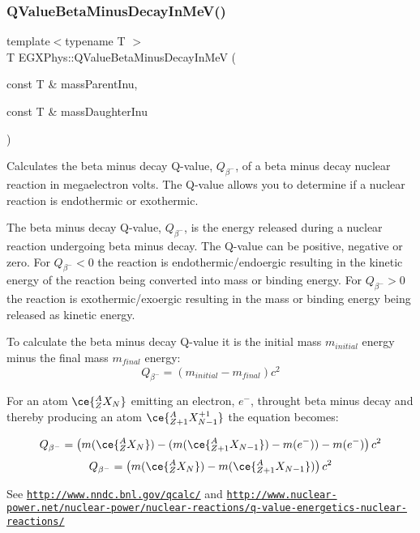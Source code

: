 \subsubsection{\texorpdfstring{Q\+Value\+Beta\+Minus\+Decay\+In\+Me\+V()}{QValueBetaMinusDecayInMeV()}}
{\footnotesize\ttfamily template$<$typename T $>$ \\
T E\+G\+X\+Phys\+::\+Q\+Value\+Beta\+Minus\+Decay\+In\+MeV (\begin{DoxyParamCaption}\item[{const T \&}]{mass\+Parent\+Inu,  }\item[{const T \&}]{mass\+Daughter\+Inu }\end{DoxyParamCaption})}



Calculates the beta minus decay Q-\/value, $Q_{\beta^-}$, of a beta minus decay nuclear reaction in megaelectron volts. The Q-\/value allows you to determine if a nuclear reaction is endothermic or exothermic. 

The beta minus decay Q-\/value, $Q_{\beta^-}$, is the energy released during a nuclear reaction undergoing beta minus decay. The Q-\/value can be positive, negative or zero. For $Q_{\beta^-} < 0$ the reaction is endothermic/endoergic resulting in the kinetic energy of the reaction being converted into mass or binding energy. For $Q_{\beta^-} > 0$ the reaction is exothermic/exoergic resulting in the mass or binding energy being released as kinetic energy.

To calculate the beta minus decay Q-\/value it is the initial mass $m_{initial}$ energy minus the final mass $m_{final}$ energy\+: \[Q_{\beta^-} = \left ( m_{initial}-m_{final}\right ) c^2\]

For an atom $\ce{ ^{A}_{Z}X_{N} }$ emitting an electron, $e^-$, throught beta minus decay and thereby producing an atom $\ce{ ^{A}_{Z{+1}}X^{+1}_{N-1} }$ the equation becomes\+:

\[Q_{\beta^-} = \left ( m(\ce{ ^{A}_{Z}X_{N} }) - (m(\ce{ ^{A}_{Z{+1}}X_{N-1} }) - m(e^-)) - m(e^-)\right ) c^2\] \[Q_{\beta^-} = \left ( m(\ce{ ^{A}_{Z}X_{N} }) - m(\ce{ ^{A}_{Z{+1}}X_{N-1} })\right ) c^2\]

See \href{http://www.nndc.bnl.gov/qcalc/}{\tt http\+://www.\+nndc.\+bnl.\+gov/qcalc/} and \href{http://www.nuclear-power.net/nuclear-power/nuclear-reactions/q-value-energetics-nuclear-reactions/}{\tt http\+://www.\+nuclear-\/power.\+net/nuclear-\/power/nuclear-\/reactions/q-\/value-\/energetics-\/nuclear-\/reactions/}

